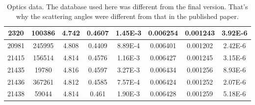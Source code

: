\begin{table}
\begin{tabular}{c c | c c c | c c c}
	2320	& 100386    & 4.742 & 0.4607	& 1.45E-3    & 0.006254    & 0.001243    & 3.92E-6    \\
	\hline
	20981	& 245995    & 4.808 & 0.4409	& 8.89E-4    & 0.006401    & 0.001202    & 2.42E-6    \\
	21415	& 156514    & 4.814 & 0.4576	& 1.16E-3    & 0.006427    & 0.001245    & 3.15E-6    \\
	21435	& 19780	    & 4.816 & 0.4597	& 3.27E-3    & 0.006434    & 0.001256    & 8.93E-6    \\
	21436	& 367261    & 4.812 & 0.4585	& 7.57E-4    & 0.006424    & 0.001252    & 2.07E-6    \\
	21438	& 59044	    & 4.814 & 0.461	& 1.90E-3    & 0.006428    & 0.001259    & 5.18E-6    \\
	\hline
    \end{tabular}
    \caption{Optics data. The database used here was different from the final version.
    That's why the scattering angles were different from that in the published paper.}
\end{table}
\begin{comment}
\section{Resource}
\begin{itemize}
    \item hall A equipment: https://hallaweb.jlab.org/equipment/
\end{itemize}
\end{comment}
